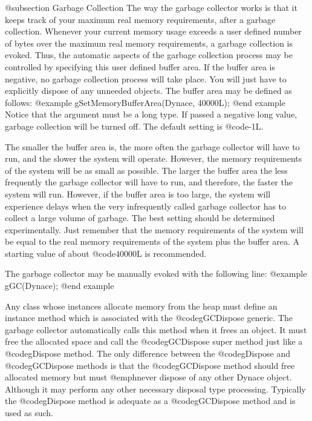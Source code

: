 @subsection Garbage Collection
The way the garbage collector works is that it keeps track of your
maximum real memory requirements, after a garbage collection.  Whenever
your current memory usage exceeds a user defined number of bytes over
the maximum real memory requirements, a garbage collection is evoked.
Thus, the automatic aspects of the garbage collection process may be
controlled by specifying this user defined buffer area.  If the buffer
area is negative, no garbage collection process will take place.  You
will just have to explicitly dispose of any unneeded objects.  The
buffer area may be defined as follows:
@example
        gSetMemoryBufferArea(Dynace, 40000L);
@end example
Notice that the argument must be a long type.  If passed a negative long value,
garbage collection will be turned off.  The default setting is @code{-1L}.

The smaller the buffer area is, the more often the garbage collector will
have to run, and the slower the system will operate.  However, the memory
requirements of the system will be as small as possible.  The larger the
buffer area the less frequently the garbage collector will have to run, and
therefore, the faster the system will run.  However, if the buffer area is
too large, the system will experience delays when the very infrequently
called garbage collector has to collect a large volume of garbage.  The
best setting should be determined experimentally.  Just remember that
the memory requirements of the system will be equal to the real memory
requirements of the system plus the buffer area.  A starting value
of about @code{40000L} is recommended.

The garbage collector may be manually evoked with the following line:
@example
        gGC(Dynace);
@end example

Any class whose instances allocate memory from the heap must define an
instance method which is associated with the @code{gGCDispose} generic.
The garbage collector automatically calls this method when it frees an
object.  It must free the allocated space and call the @code{gGCDispose}
super method just like a @code{gDispose} method.  The only difference
between the @code{gDispose} and @code{gGCDispose} methods is that the
@code{gGCDispose} method should free allocated memory but must
@emph{never} dispose of any other Dynace object.  Although it may perform
any other necessary disposal type processing.  Typically the
@code{gDispose} method is adequate as a @code{gGCDispose} method and is
used as such.

